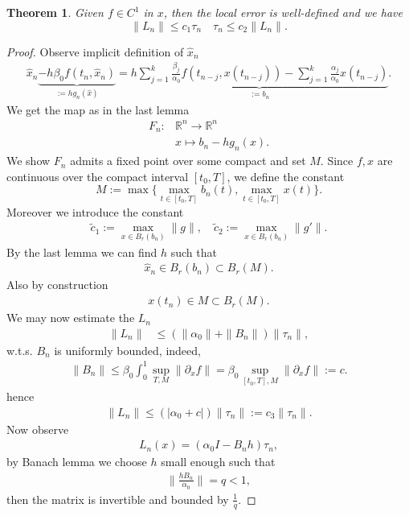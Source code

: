 \documentclass[a4paper,12pt,oneside,fleqn]{book}
\newtheorem{theorem}{Theorem}[section]
\theoremstyle{definition}
\theoremstyle{remark}
\begin{document}
\begin{theorem}
	Given $f \in C^1$ in $x$, then the local error is well-defined and we have
	\begin{equation}
		\|L_n\| \le c_1 \tau_n \quad \tau_n \le c_2\|L_n\|.
	\end{equation}
\end{theorem}
\begin{proof}
	Observe implicit definition of $\hat{x}_n$
	\begin{align*}
		\hat{x}_n  \underbrace{- h \beta_0 f(t_n, \hat{x}_n)}_{:= hg_n(\hat{x})}    = \underbrace{ h\sum_{j = 1}^k \frac{\beta_j}{\alpha_0} f(t_{n - j}, x(t_{n - j})) - \sum_{j = 1}^k \frac{\alpha_j}{\alpha_0} x(t_{n - j}) }_{:= b_n}.
	\end{align*}
	We get the map as in the last lemma
	\begin{align*}
		 F_n: & \mathbb{R}^n \rightarrow \mathbb{R}^n\\
		& x  \mapsto b_n -  h g_n(x).
	\end{align*}
	We show $F_n$ admits a fixed point over some compact and set $M$. Since $f, x$ are continuous over the compact interval $[t_0, T]$, we define the constant
	\begin{equation*}
		M := \max\bigg\{ \max_{t \in [t_0, T]} b_n(t), \max_{t \in [t_0, T]} x(t) \bigg\}.
	\end{equation*} 
	Moreover we introduce the constant
	\begin{align*}
		\tilde{c}_1:= \max_{x \in B_r(b_n)} \|g\|, \quad \tilde{c}_2:= \max_{x \in B_r(b_n)} \|g'\|.
	\end{align*}
	By the last lemma we can find $h$ such that 
	\begin{align*}
		\hat{x}_n \in B_r(b_n) \subset B_r(M). 
	\end{align*}
	Also by construction 
	\begin{align*}
		x(t_n) \in M \subset B_r(M). 
	\end{align*}
	We may now estimate the $L_n$ 
	\begin{align*}
		\|L_n\| & \le (\|\alpha_0\| + \|B_n\|)\|\tau_n\|,
	\end{align*}
	w.t.s. $B_n$ is uniformly bounded, indeed, 
	\begin{align*}
		\|B_n\| \le \beta_0  \int_0^1 \sup_{T, M}\| \partial_x f \| = \beta_0 \sup_{[t_0, T], M} \|\partial_x f\|:= c.
	\end{align*}
	hence
	\begin{align*}
		\|L_n\| \le (|\alpha_0 + c|)\|\tau_n\|:= c_3 \|\tau_n\|.
	\end{align*}
	Now observe 
	\begin{align*}
		L_n(x) = ( \alpha_0 I - B_n h) \tau_n, 
	\end{align*}
	by Banach lemma we choose $h$ small enough such that 
	\begin{align*}
		\|\frac{hB_n}{\alpha_0}\|  = q < 1,
	\end{align*}
	then the matrix is invertible and bounded by $\frac{1}{q}$. 
\end{proof}
\end{document}
